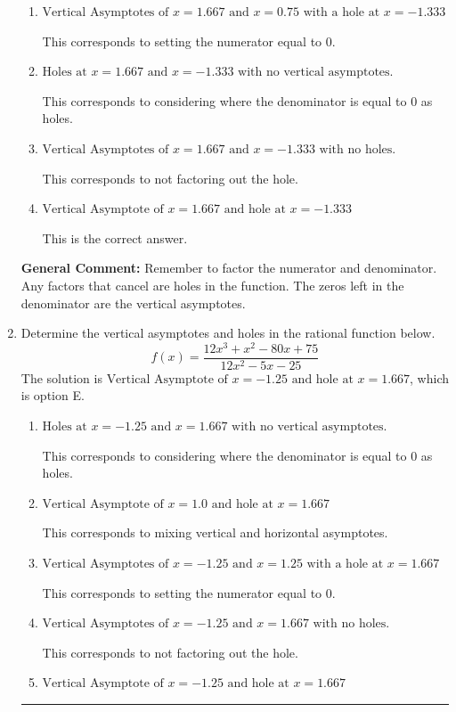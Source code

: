 \documentclass{extbook}[14pt]
\newcommand{\litem}[1]{\item #1

\rule{\textwidth}{0.4pt}}
\begin{document}
\begin{enumerate}
{\begin{enumerate}[label=\Alph*.]
This corresponds to mixing vertical and horizontal asymptotes.
\item \( \text{Vertical Asymptotes of } x = 1.667 \text{ and } x = 0.75 \text{ with a hole at } x = -1.333 \)

This corresponds to setting the numerator equal to 0.
\item \( \text{Holes at } x = 1.667 \text{ and } x = -1.333 \text{ with no vertical asymptotes.} \)

This corresponds to considering where the denominator is equal to 0 as holes.
\item \( \text{Vertical Asymptotes of } x = 1.667 \text{ and } x = -1.333 \text{ with no holes.} \)

This corresponds to not factoring out the hole.
\item \( \text{Vertical Asymptote of } x = 1.667 \text{ and hole at } x = -1.333 \)

This is the correct answer.
\end{enumerate}

\textbf{General Comment:} Remember to factor the numerator and denominator. Any factors that cancel are holes in the function. The zeros left in the denominator are the vertical asymptotes.
}
\litem{
Determine the vertical asymptotes and holes in the rational function below.
\[ f(x) = \frac{12x^{3} + x^{2} -80 x + 75}{12x^{2} -5 x -25} \]The solution is \( \text{Vertical Asymptote of } x = -1.25 \text{ and hole at } x = 1.667 \), which is option E.\begin{enumerate}[label=\Alph*.]
\item \( \text{Holes at } x = -1.25 \text{ and } x = 1.667 \text{ with no vertical asymptotes.} \)

This corresponds to considering where the denominator is equal to 0 as holes.
\item \( \text{Vertical Asymptote of } x = 1.0 \text{ and hole at } x = 1.667 \)

This corresponds to mixing vertical and horizontal asymptotes.
\item \( \text{Vertical Asymptotes of } x = -1.25 \text{ and } x = 1.25 \text{ with a hole at } x = 1.667 \)

This corresponds to setting the numerator equal to 0.
\item \( \text{Vertical Asymptotes of } x = -1.25 \text{ and } x = 1.667 \text{ with no holes.} \)

This corresponds to not factoring out the hole.
\item \( \text{Vertical Asymptote of } x = -1.25 \text{ and hole at } x = 1.667 \)


\end{enumerate}}
\end{enumerate}
\end{document}
